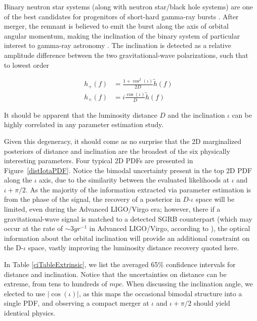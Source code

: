 \documentclass[11pt,a4paper]{emulateapj}
\newcommand{\carl}[1]{{\color{red}  #1}}
\begin{document}
Binary neutron star systems (along with neutron star/black hole systems) are one of the best candidates for progenitors of short-hard gamma-ray bursts \citep[and references therein]{Nakar2007}.  After merger, the remnant is believed to emit the burst along the axis of orbital angular momentum, making the inclination of the binary system of particular interest to gamma-ray astronomy \citep{LSCGRB2010,Corsi2012}.  The inclination is detected as a relative amplitude difference between the two gravitational-wave polarizations, such that to lowest order

\begin{align}
h_+(f) &= \frac{1+\cos^2(\iota)}{2 D} \tilde{h}(f) \nonumber \\
h_\times(f) &= i \frac{\cos(\iota)}{D}\tilde{h}(f)
\end{align}

\noindent It should be apparent that the luminosity distance $D$ and the inclination $\iota$ can be highly correlated in any parameter estimation study.

Given this degeneracy, it should come as no surprise that the 2D marginalized posteriors of distance
 and inclination are the broadest of the six physically interesting parameters.  Four typical 2D PDFs are
  presented in Figure~\ref{distIotaPDF}.  Notice the bimodal uncertainty 
present in the top 2D PDF along the $\iota$ axis, due to the similarity between the evaluated
 likelihoods at $\iota$ and $\iota + \pi/2$.  As the majority of the information extracted via parameter 
 estimation is from the phase of the signal, the recovery of a posterior in $D$-$\iota$ space will be 
 limited, even during the Advanced LIGO/Virgo era; however, there if a gravitational-wave signal is 
 matched to a detected SGRB counterpart (which may occur at the rate of $\sim 3 yr^{-1}$ in Advanced LIGO/Virgo, 
 according to \cite{Metzger2013}), the optical information about the orbital inclination
 will provide an additional constraint on the D-$\iota$ space, vastly improving the luminosity distance recovery
 quoted here.
 
 
In Table \ref{ciTableExtrinsic}, we list the averaged 65\% confidence intervals for distance and inclination.  
Notice that the uncertainties on distance can be extreme, from tens to hundreds of $mpc$.  When discussing
the inclination angle, we elected to use $|\cos(\iota)|$, as this maps the occasional bimodal structure into
a single PDF, 
 and observing a compact merger at $\iota$ and $\iota + \pi/2$ should yield identical physics.  
\end{document}
